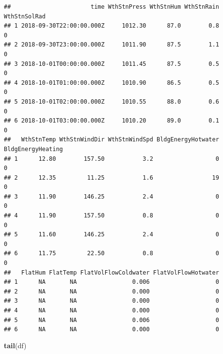 \documentclass[
]{book}
\newenvironment{Shaded}{\begin{snugshade}}{\end{snugshade}}
\newcommand{\KeywordTok}[1]{\textcolor[rgb]{0.13,0.29,0.53}{\textbf{#1}}}
\newcommand{\NormalTok}[1]{#1}
\begin{document}
\begin{verbatim}
##                       time WthStnPress WthStnHum WthStnRain WthStnSolRad
## 1 2018-09-30T22:00:00.000Z     1012.30      87.0        0.8            0
## 2 2018-09-30T23:00:00.000Z     1011.90      87.5        1.1            0
## 3 2018-10-01T00:00:00.000Z     1011.45      87.5        0.5            0
## 4 2018-10-01T01:00:00.000Z     1010.90      86.5        0.5            0
## 5 2018-10-01T02:00:00.000Z     1010.55      88.0        0.6            0
## 6 2018-10-01T03:00:00.000Z     1010.20      89.0        0.1            0
##   WthStnTemp WthStnWindDir WthStnWindSpd BldgEnergyHotwater BldgEnergyHeating
## 1      12.80        157.50           3.2                  0                 0
## 2      12.35         11.25           1.6                 19                 0
## 3      11.90        146.25           2.4                  0                 0
## 4      11.90        157.50           0.8                  0                 0
## 5      11.60        146.25           2.4                  0                 0
## 6      11.75         22.50           0.8                  0                 0
##   FlatHum FlatTemp FlatVolFlowColdwater FlatVolFlowHotwater
## 1      NA       NA                0.006                   0
## 2      NA       NA                0.000                   0
## 3      NA       NA                0.000                   0
## 4      NA       NA                0.000                   0
## 5      NA       NA                0.006                   0
## 6      NA       NA                0.000                   0
\end{verbatim}

\begin{Shaded}
\begin{Highlighting}[]
\KeywordTok{tail}\NormalTok{(df)}
\end{Highlighting}
\end{Shaded}
\end{document}
